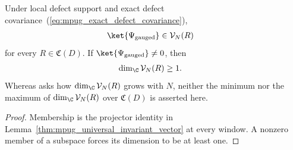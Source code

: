 \begin{lemma}
    \label{thm:mpug_gauge_invariant_subspace_finrank}
    \leanok
    Under local defect support and exact defect
    covariance~(\ref{eq:mpug_exact_defect_covariance}),
    \begin{align}
        \ket{\Psi_{\mathrm{gauged}}} & \in\mathcal V_N(R)
    \end{align}
    for every $R\in\mathfrak C(D)$. If $\ket{\Psi_{\mathrm{gauged}}}\neq0$, then
    \begin{align}
        \dim_{\C}\mathcal V_N(R) & \geq1.
    \end{align}
    Whereas \cite[line~5198]{FrancoRubio2025MPUGauging} asks how
    $\dim_{\C}\mathcal V_N(R)$ grows with $N$, neither the minimum nor the
    maximum of $\dim_{\C}\mathcal V_N(R)$ over $\mathfrak C(D)$ is asserted
    here.
\end{lemma}

\begin{proof}\leanok
    Membership is the projector identity in
    Lemma~\ref{thm:mpug_universal_invariant_vector} at every window. A
    nonzero member of a subspace forces its dimension to be at least one.
\end{proof}

